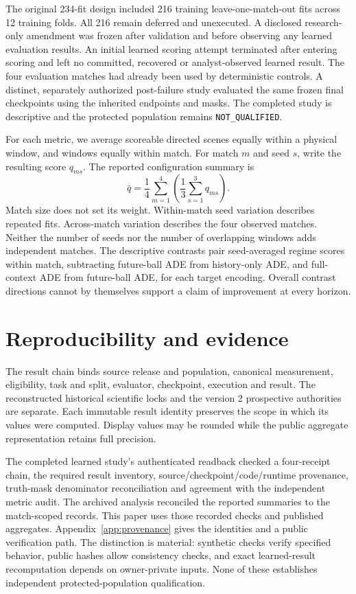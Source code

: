 \documentclass[10pt]{article}
\begin{document}
The original 234-fit design included 216 training leave-one-match-out fits across 12 training folds. All 216 remain deferred and unexecuted. A disclosed research-only amendment was frozen after validation and before observing any learned evaluation results. An initial learned scoring attempt terminated after entering scoring and left no committed, recovered or analyst-observed learned result. The four evaluation matches had already been used by deterministic controls. A distinct, separately authorized post-failure study evaluated the same frozen final checkpoints using the inherited endpoints and masks. The completed study is descriptive and the protected population remains \texttt{NOT\_QUALIFIED}.

For each metric, we average scoreable directed scenes equally within a physical window, and windows equally within match. For match $m$ and seed $s$, write the resulting score $q_{ms}$. The reported configuration summary is
\begin{equation}
 \bar q=\frac{1}{4}\sum_{m=1}^{4}\left(\frac{1}{3}\sum_{s=1}^{3} q_{ms}\right).
\end{equation}
Match size does not set its weight. Within-match seed variation describes repeated fits. Across-match variation describes the four observed matches. Neither the number of seeds nor the number of overlapping windows adds independent matches. The descriptive contrasts pair seed-averaged regime scores within match, subtracting future-ball ADE from history-only ADE, and full-context ADE from future-ball ADE, for each target encoding. Overall contrast directions cannot by themselves support a claim of improvement at every horizon.

\section{Reproducibility and evidence}

The result chain binds source release and population, canonical measurement, eligibility, task and split, evaluator, checkpoint, execution and result. The reconstructed historical scientific locks and the version 2 prospective authorities are separate. Each immutable result identity preserves the scope in which its values were computed. Display values may be rounded while the public aggregate representation retains full precision.

The completed learned study's authenticated readback checked a four-receipt chain, the required result inventory, source/checkpoint/code/runtime provenance, truth-mask denominator reconciliation and agreement with the independent metric audit. The archived analysis reconciled the reported summaries to the match-scoped records. This paper uses those recorded checks and published aggregates. Appendix~\ref{app:provenance} gives the identities and a public verification path. The distinction is material: synthetic checks verify specified behavior, public hashes allow consistency checks, and exact learned-result recomputation depends on owner-private inputs. None of these establishes independent protected-population qualification.
\end{document}
